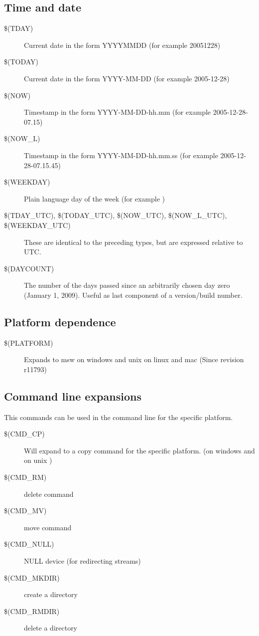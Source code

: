\subsection{Time and date}

\begin{description}
\item[{\footnotesize \$(TDAY)}] Current date in the form YYYYMMDD (for example 20051228)
\item[{\footnotesize \$(TODAY)}] Current date in the form YYYY-MM-DD (for example 2005-12-28)
\item[{\footnotesize \$(NOW)}] Timestamp in the form YYYY-MM-DD-hh.mm (for example 2005-12-28-07.15)
\item[{\footnotesize \$(NOW\_L)}] Timestamp in the form YYYY-MM-DD-hh.mm.ss (for example 2005-12-28-07.15.45)
\item[{\footnotesize \$(WEEKDAY)}]  Plain language day of the week (for example )
\item[{\footnotesize \$(TDAY\_UTC), \$(TODAY\_UTC), \$(NOW\_UTC), \$(NOW\_L\_UTC), \$(WEEKDAY\_UTC)}] These are identical to the preceding types, but are expressed relative to UTC.
\item[{\footnotesize \$(DAYCOUNT)}] The number of the days passed since an arbitrarily chosen day zero (January 1, 2009). Useful as last component of a version/build number.
\end{description}

\subsection{Platform dependence}

\begin{description}
\item[{\footnotesize \$(PLATFORM)}] Expands to msw on windows and unix on linux and mac (Since revision r11793) 
\end{description}

\subsection{Command line expansions}
This commands can be used in the command line for the specific platform. 
\begin{description}
\item[{\footnotesize \$(CMD\_CP)}] Will expand to a copy command for the specific platform. (on windows  and on unix ) 
\item[{\footnotesize \$(CMD\_RM)}] delete command
\item[{\footnotesize \$(CMD\_MV)}] move command
\item[{\footnotesize \$(CMD\_NULL)}] NULL device (for redirecting streams)
\item[{\footnotesize \$(CMD\_MKDIR)}] create a directory
\item[{\footnotesize \$(CMD\_RMDIR)}] delete a directory
\end{description}

